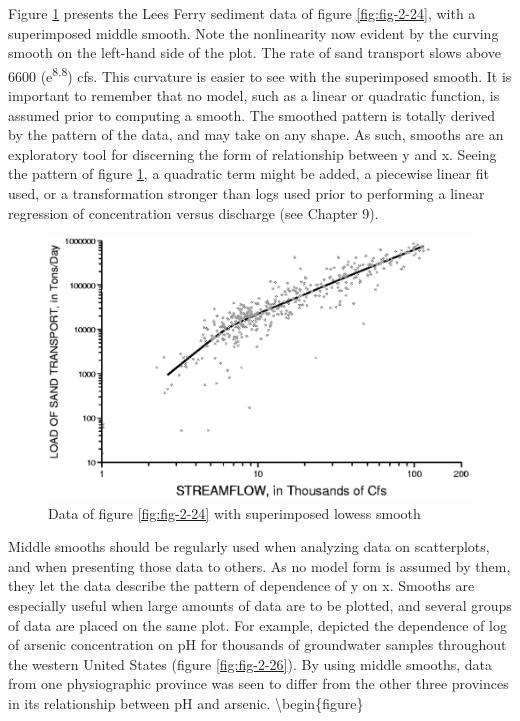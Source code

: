 \documentclass[]{book}
\begin{document}
Figure \ref{fig:fig-2-25} presents the Lees Ferry sediment data of figure \ref{fig:fig-2-24}, with a superimposed middle smooth. Note the nonlinearity now evident by the curving smooth on the left-hand side of the plot. The rate of sand transport slows above 6600 (e\textsuperscript{8.8}) cfs. This curvature is easier to see with the superimposed smooth. It is important to remember that no model, such as a linear or quadratic function, is assumed prior to computing a smooth. The smoothed pattern is totally derived by the pattern of the data, and may take on any shape. As such, smooths are an exploratory tool for discerning the form of relationship between y and x. Seeing the pattern of figure \ref{fig:fig-2-25}, a quadratic term might be added, a piecewise linear fit used, or a transformation stronger than logs used prior to performing a linear regression of concentration versus discharge (see Chapter 9).

\begin{figure}

{\centering \includegraphics[width=13.33in]{figures/2_25} 

}

\caption{Data of figure \ref{fig:fig-2-24} with superimposed lowess smooth}\label{fig:fig-2-25}
\end{figure}

Middle smooths should be regularly used when analyzing data on scatterplots, and when presenting those data to others. As no model form is assumed by them, they let the data describe the pattern of dependence of y on x. Smooths are especially useful when large amounts of data are to be plotted, and several groups of data are placed on the same plot. For example, \citet{welch_arsenic_1988} depicted the dependence of log of arsenic concentration on pH for thousands of groundwater samples throughout the western United States (figure \ref{fig:fig-2-26}). By using middle smooths, data from one physiographic province was seen to differ from the other three provinces in its relationship between pH and arsenic.
\textbackslash{}begin\{figure\}
\end{document}
